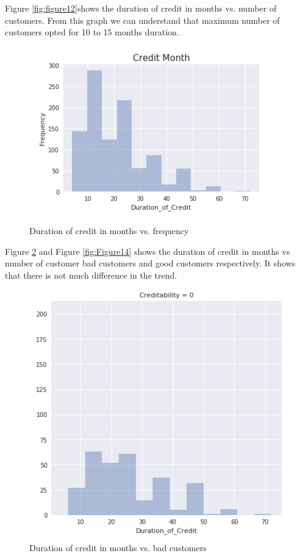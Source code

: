 \documentclass[sigconf]{acmart}
\begin{document}
Figure \ref{fig:figure12}shows the duration of credit in months vs. number of customers. From this graph we can understand that maximum number of customers opted for 10 to 15 months duration.

\begin{figure}[htb]
  \centering
  \includegraphics[width=1.0\columnwidth]{images/Figure12.png}
  \caption{Duration of credit in months vs. frequency}
  \label{fig:Figure12}
\end{figure}

Figure \ref{fig:Figure13} and Figure \ref{fig:Figure14} shows the duration of credit in months vs number of customer bad customers and good customers respectively. It shows that there is not much difference in the trend.

\begin{figure}[htb]
  \centering
  \includegraphics[width=1.0\columnwidth]{images/Figure13.png}
  \caption{Duration of credit in months vs. bad customers}
  \label{fig:Figure13} 
\end{figure}
\end{document}
